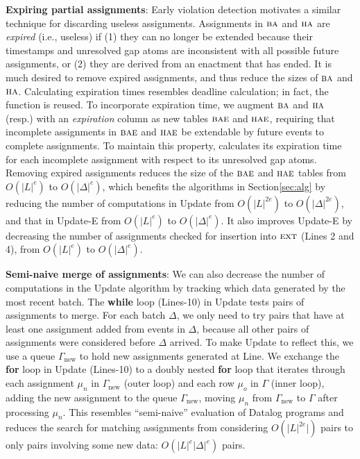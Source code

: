 {\bf Expiring partial assignments}:
Early violation detection motivates
a similar technique for discarding useless assignments.
Assignments in $\BODY/$ and $\HEAD/$
are {\em expired} (i.e., useless)
if (1) they can no longer be extended
because their timestamps
and unresolved gap atoms
are inconsistent with all possible future assignments,
or
(2) they are derived from an enactment that has ended.
It is much desired to remove expired assignments,
and thus reduce the sizes of $\BODY/$ and $\HEAD/$.
Calculating expiration times
resembles deadline calculation;
in fact, the {\DDL} function is reused.
To incorporate expiration time,
we augment $\BODY/$ and $\HEAD/$ (resp.) with
an {\em expiration} column
as new tables $\textsc{bae}$ and $\textsc{hae}$,
requiring that incomplete assignments in $\textsc{bae}$ and $\textsc{hae}$
be extendable by future events to complete assignments.
To maintain this property,
{\DDL} calculates its expiration time
for each incomplete assignment
with respect to its unresolved gap atoms.
Removing expired assignments reduces 
the size of the $\textsc{bae}$ and $\textsc{hae}$ tables from
$O(|L|^{e})$ to $O(|\Delta|^{e})$,
which 
benefits the algorithms in Section\:\ref{sec:alg}
by reducing
the number of computations in {\sf Update}
from $O(|L|^{2e})$ to $O(|\Delta|^{2e})$,
and 
that in {\sf Update-E}
from $O(|L|^{e})$ to $O(|\Delta|^{e})$.
It also 
improves {\sf Update-E}
by decreasing the number of assignments
checked for insertion into $\textsc{ext}$
(Lines 2 and 4),
from $O(|L|^{e})$ to $O(|\Delta|^{e})$.

{\bf Semi-naive {\sc merge} of assignments}:
We can also decrease the number of computations in the {\sf Update} algorithm
by tracking which data generated by the most recent batch.
The {\bf while} loop (Lines-10) in {\sf Update} 
tests pairs of assignments to merge.
For each batch $\Delta$,
we only need to try pairs
that have at least one assignment added from events in $\Delta$,
because all other pairs of assignments were considered
before $\Delta$ arrived.
To make {\sf Update} to reflect this,
we use a queue $\Gamma_{\textrm{new}}$ to hold new assignments
generated at Line.
We exchange the {\bf for} loop in {\sf Update}
(Lines-10)
to a doubly nested {\bf for} loop
that iterates
through each assignment $\mu_n$ in $\Gamma_{\textrm{new}}$ (outer loop)
and each row $\mu_o$ in $\Gamma$ (inner loop),
adding the new assignment to the queue $\Gamma_{\textrm{new}}$,
moving $\mu_n$ from $\Gamma_{\textrm{new}}$ to $\Gamma$
after processing $\mu_n$.
This resembles ``semi-naive'' evaluation of Datalog programs \cite{AHV95}
and reduces the search
for matching assignments
from considering $O(|L|^{2e}|)$ pairs
to only pairs involving some new data: $O(|L|^{e}|\Delta|^{e})$ pairs.

